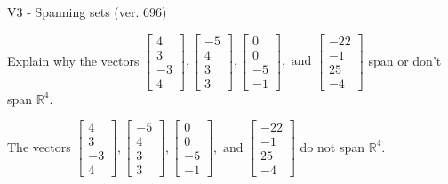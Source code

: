 \begin{exercise}
  \begin{exerciseTitle}V3 - Spanning sets (ver. 696)\end{exerciseTitle}
  \begin{exerciseStatement}
    Explain why the vectors \(\left[\begin{array}{r}
4 \\
3 \\
-3 \\
4
\end{array}\right] , \left[\begin{array}{r}
-5 \\
4 \\
3 \\
3
\end{array}\right] , \left[\begin{array}{r}
0 \\
0 \\
-5 \\
-1
\end{array}\right] , \text{ and } \left[\begin{array}{r}
-22 \\
-1 \\
25 \\
-4
\end{array}\right]\) span or don't span \(\mathbb{R}^4\). 
	


  \end{exerciseStatement}
  \begin{exerciseAnswer}
   The vectors \(\left[\begin{array}{r}
4 \\
3 \\
-3 \\
4
\end{array}\right] , \left[\begin{array}{r}
-5 \\
4 \\
3 \\
3
\end{array}\right] , \left[\begin{array}{r}
0 \\
0 \\
-5 \\
-1
\end{array}\right] , \text{ and } \left[\begin{array}{r}
-22 \\
-1 \\
25 \\
-4
\end{array}\right]\) 
  	 do not  
	span \(\mathbb{R}^4\).
  


  \end{exerciseAnswer}
\end{exercise}